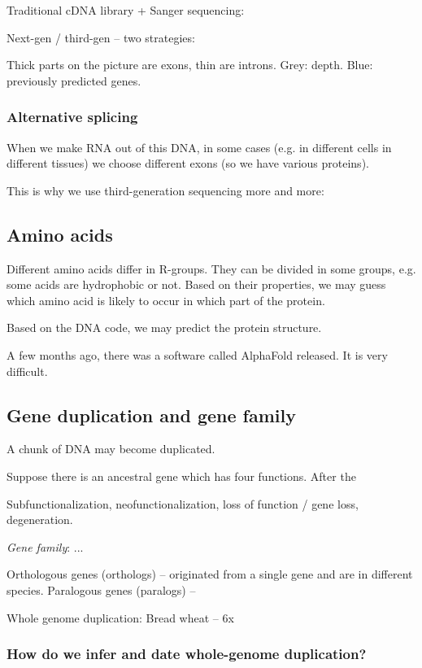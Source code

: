 \documentclass[main.tex]{subfiles}
\begin{document}
Traditional cDNA library + Sanger sequencing:

Next-gen / third-gen -- two strategies:

Thick parts on the picture are exons, thin are introns.
Grey: depth.
Blue: previously predicted genes.

\subsubsection{Alternative splicing}

When we make RNA out of this DNA, in some cases (e.g. in different cells in different tissues) we choose different exons (so we have various proteins).

This is why we use third-generation sequencing more and more:

\subsection{Amino acids}

Different amino acids differ in R-groups.
They can be divided in some groups, e.g. some acids are hydrophobic or not.
Based on their properties, we may guess which amino acid is likely to occur in which part of the protein.

Based on the DNA code, we may predict the protein structure.

A few months ago, there was a software called AlphaFold released.
It is very difficult.

\subsection{Gene duplication and gene family}

A chunk of DNA may become duplicated.

Suppose there is an ancestral gene which has four functions.
After the 

Subfunctionalization, neofunctionalization, loss of function / gene loss, degeneration.

\emph{Gene family}: ...

Orthologous genes (orthologs) -- originated from a single gene and are in different species.
Paralogous genes (paralogs) -- 

Whole genome duplication:
Bread wheat -- 6x

\subsubsection{How do we infer and date whole-genome duplication?}
\end{document}
